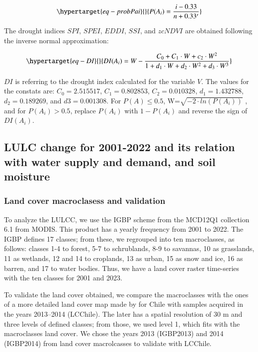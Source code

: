 \documentclass[
  number,
  preprint,
  3p,
  onecolumn]{elsarticle}
\begin{document}
\begin{equation}\protect\hypertarget{eq-probPai}{}{P(A_i) = \frac{i-0.33}{n+0.33'}}\label{eq-probPai}\end{equation}

The drought indices \(SPI\), \(SPEI\), \(EDDI\), \(SSI\), and \(zcNDVI\)
are obtained following the inverse normal approximation:

\begin{equation}\protect\hypertarget{eq-DI}{}{DI(A_i) = W - \frac{C_0+C_1\cdot W + c_2 \cdot W^2}{1+d_1\cdot W +d_2\cdot W^2 +d_3\cdot W^3}}\label{eq-DI}\end{equation}

\(DI\) is referring to the drought index calculated for the variable
\(V\). The values for the constats are: \(C_0 = 2.515517\),
\(C_1 = 0.802853\), \(C_2 = 0.010328\), \(d_1 = 1.432788\),
\(d_2 = 0.189269\), and \(d3 = 0.001308\). For \(P(A) \leq 0.5\),
W=\(\sqrt{-2\cdot ln(P(A_i))}\) , and for \(P(A_i) > 0.5\), replace
\(P(A_i)\) with \(1-P(A_i)\) and reverse the sign of \(DI(A_i)\).

\hypertarget{sec-methods_lulc}{%
\subsection{LULC change for 2001-2022 and its relation with water supply
and demand, and soil moisture}\label{sec-methods_lulc}}

\hypertarget{land-cover-macroclasess-and-validation}{%
\subsubsection{Land cover macroclasess and
validation}\label{land-cover-macroclasess-and-validation}}

To analyze the LULCC, we use the IGBP scheme from the MCD12Q1 collection
6.1 from MODIS. This product has a yearly frequency from 2001 to 2022.
The IGBP defines 17 classes; from these, we regrouped into ten
macroclasses, as follows: classes 1-4 to forest, 5-7 to schrublands, 8-9
to savannas, 10 as grasslands, 11 as wetlands, 12 and 14 to croplands,
13 as urban, 15 as snow and ice, 16 as barren, and 17 to water bodies.
Thus, we have a land cover raster time-series with the ten classes for
2001 and 2023.

To validate the land cover obtained, we compare the macroclasses with
the ones of a more detailed land cover map made by \citep{Zhao2016} for
Chile with samples acquired in the years 2013--2014 (LCChile). The later
has a spatial resolution of 30 m and three levels of defined classes;
from those, we used level 1, which fits with the macroclasses land
cover. We chose the years 2013 (IGBP2013) and 2014 (IGBP2014) from land
cover macrolcasses to validate with LCChile.
\end{document}
